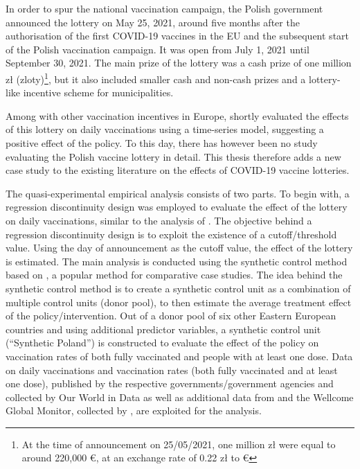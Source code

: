 \documentclass{scrbook}
\begin{document}
In order to spur the national vaccination campaign, the Polish
government announced the lottery
\parencite{service_of_the_republic_of_poland_national_2021} on May 25,
2021, around five months after the authorisation of the first COVID-19
vaccines in the EU and the subsequent start of the Polish vaccination
campaign. It was open from July 1, 2021 until September 30, 2021. The
main prize of the lottery was a cash prize of one million zł
(zloty)\footnote{At the time of announcement on 25/05/2021, one million zł were equal to around 220,000 €, at an exchange rate of 0.22 zł to €},
but it also included smaller cash and non-cash prizes and a lottery-like
incentive scheme for municipalities.

Among with other vaccination incentives in Europe,
\textcite{kuznetsova_effectiveness_2022} shortly evaluated the effects
of this lottery on daily vaccinations using a time-series model,
suggesting a positive effect of the policy. To this day, there has
however been no study evaluating the Polish vaccine lottery in detail.
This thesis therefore adds a new case study to the existing literature
on the effects of COVID-19 vaccine lotteries.

The quasi-experimental empirical analysis consists of two parts. To
begin with, a regression discontinuity design was employed to evaluate
the effect of the lottery on daily vaccinations, similar to the analysis
of \textcite{kuznetsova_effectiveness_2022}. The objective behind a
regression discontinuity design is to exploit the existence of a
cutoff/threshold value. Using the day of announcement as the cutoff
value, the effect of the lottery is estimated. The main analysis is
conducted using the synthetic control method based on
\textcite{abadie_economic_2003}, a popular method for comparative case
studies. The idea behind the synthetic control method is to create a
synthetic control unit as a combination of multiple control units (donor
pool), to then estimate the average treatment effect of the
policy/intervention. Out of a donor pool of six other Eastern European
countries and using additional predictor variables, a synthetic control
unit (``Synthetic Poland'') is constructed to evaluate the effect of the
policy on vaccination rates of both fully vaccinated and people with at
least one dose. Data on daily vaccinations and vaccination rates (both
fully vaccinated and at least one dose), published by the respective
governments/government agencies and collected by Our World in Data
\parencite{mathieu_global_2021} as well as additional data from
\textcite{eurostat_eurostat_2023} and the Wellcome Global Monitor,
collected by \textcite{our_world_in_data_share_2020}, are exploited for
the analysis.
\end{document}
